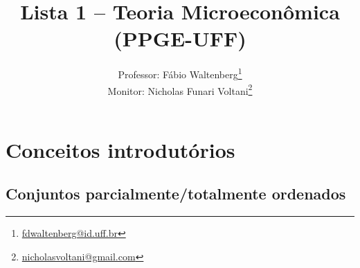 \documentclass[12pt]{article}
\title{Lista 1 -- Teoria Microeconômica (PPGE-UFF)}
\author{Professor: Fábio Waltenberg\thanks{\href{mailto:fdwaltenberg@id.uff.br}{fdwaltenberg@id.uff.br}} \\Monitor: Nicholas Funari Voltani\thanks{\href{mailto:nicholasvoltani@gmail.com}{nicholasvoltani@gmail.com}}}
\date{}
\numberwithin{equation}{section}
\theoremstyle{plain}
\theoremstyle{definition}
\theoremstyle{remark}
\begin{document}
\maketitle

\hypertarget{conceitos-introdutuxf3rios}{%
\section{Conceitos introdutórios}\label{conceitos-introdutuxf3rios}}

\hypertarget{conjuntos-parcialmentetotalmente-ordenados}{%
\subsection{Conjuntos parcialmente/totalmente
ordenados}\label{conjuntos-parcialmentetotalmente-ordenados}}
\end{document}
